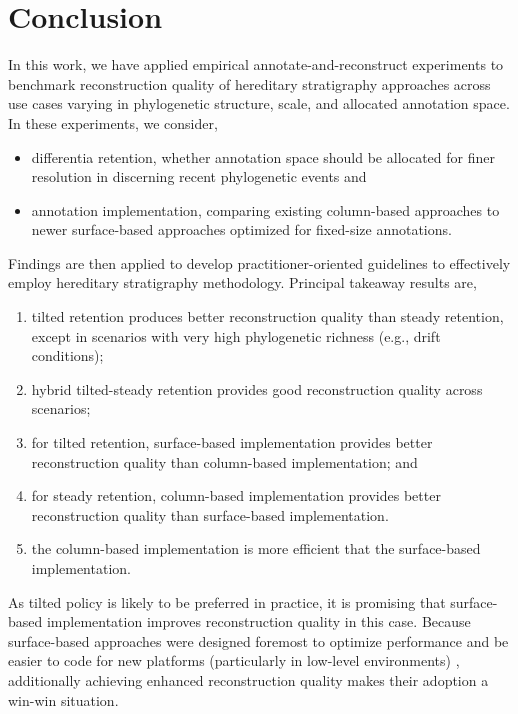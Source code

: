 \section{Conclusion} \label{sec:conclusion}

In this work, we have applied empirical annotate-and-reconstruct experiments to benchmark reconstruction quality of hereditary stratigraphy approaches across use cases varying in phylogenetic structure, scale, and allocated annotation space.
In these experiments, we consider,
\begin{itemize}
\item differentia retention, whether annotation space should be allocated for finer resolution in discerning recent phylogenetic events and
\item annotation implementation, comparing existing column-based approaches to newer surface-based approaches optimized for fixed-size annotations.
\end{itemize}

Findings are then applied to develop practitioner-oriented guidelines to effectively employ hereditary stratigraphy methodology.
Principal takeaway results are,
\begin{enumerate}
\item tilted retention produces better reconstruction quality than steady retention, except in scenarios with very high phylogenetic richness (e.g., drift conditions);
\item hybrid tilted-steady retention provides good reconstruction quality across scenarios;
\item for tilted retention, surface-based implementation provides better reconstruction quality than column-based implementation; and
\item for steady retention, column-based implementation provides better reconstruction quality than surface-based implementation.
\item the column-based implementation is more efficient that the surface-based implementation.
\end{enumerate}
As tilted policy is likely to be preferred in practice, it is promising that surface-based implementation improves reconstruction quality in this case.
Because surface-based approaches were designed foremost to optimize performance and be easier to code for new platforms (particularly in low-level environments) \citep{moreno2024trackable}, additionally achieving enhanced reconstruction quality makes their adoption a win-win situation.

